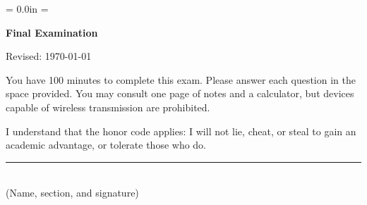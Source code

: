 \documentclass[letterpaper,12pt]{exam}
\def\HeadName{Final Examination}
\begin{document}
\parindent = 0.0in
\parskip = \bigskipamount
\thispagestyle{empty}%
\Head

\centerline{\large \bf \HeadName}%
\centerline{Revised:  \today}

\bigskip
You have 100 minutes to complete this exam.  Please answer each question in the space provided.
You may consult one page of notes and a calculator, but devices capable of wireless transmission
are prohibited.

I understand that the honor code applies: I will not lie, cheat, or
steal to gain an academic advantage, or tolerate those who do.

\begin{flushright}
\rule{4in}{0.5pt} \\ (Name, section, and signature)
\end{flushright}
\end{document}
